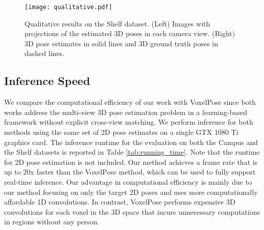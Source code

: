 \documentclass[final]{cvpr}
\begin{document}
\begin{figure*}
    \centering
    \texttt{[image: qualitative.pdf]}
    \vspace{-6mm}
    \caption{Qualitative results on the Shelf dataset. (Left) Images with projections of the estimated 3D poses in each camera view. (Right) 3D pose estimates in solid lines and 3D ground truth poses in dashed lines.}
    \label{fig:qualitative}
    \vspace{-1mm}
\end{figure*}


\renewcommand{\arraystretch}{1}
\setlength{\tabcolsep}{6pt}
\begin{table}
    \centering
    \caption{Comparison with \cite{tu2020voxelpose} on CMU Panoptic dataset.}
    \label{tab:panoptic}
    \vspace{-3mm}
\end{table}


\subsection{Inference Speed}

We compare the computational efficiency of our work with VoxelPose \cite{tu2020voxelpose} since both works address the multi-view 3D pose estimation problem in a learning-based framework without explicit cross-view matching.
We perform inference for both methods using the same set of 2D pose estimates on a single GTX 1080 Ti graphics card.
The inference runtime for the evaluation on both the Campus and the Shelf datasets is reported in Table \ref{tab:running_time}.
Note that the runtime for 2D pose estimation is not included.
Our method achieves a frame rate that is up to 20x faster than the VoxelPose method, which can be used to fully support real-time inference.
Our advantage in computational efficiency is mainly due to our method focusing on only the target 2D poses and uses more computationally affordable 1D convolutions.
In contrast, VoxelPose performs expensive 3D convolutions for each voxel in the 3D space that incurs unnecessary computations in regions without any person.
\end{document}
